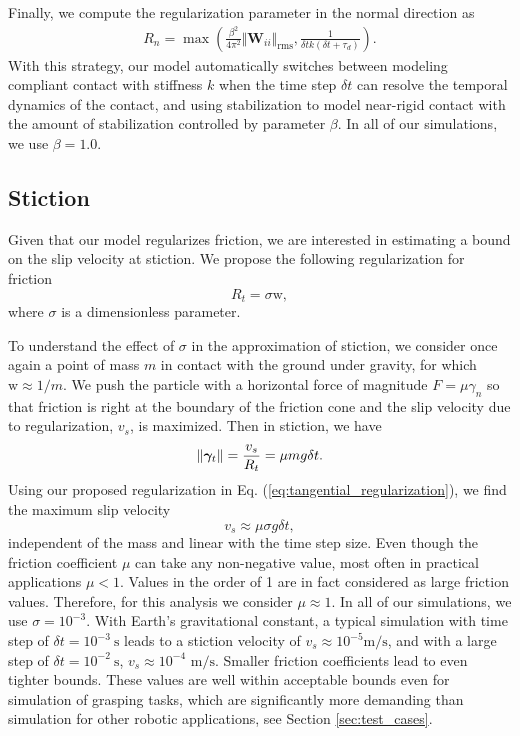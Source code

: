 Finally, we compute the regularization parameter in the normal direction as
\begin{eqnarray}
    R_n = \max\left(\frac{\beta^2}{4\pi^2}\Vert\mathbf{W}_{ii}\Vert_\text{rms},
    \frac{1}{\delta t k(\delta t+\tau_d)}\right)
    \label{eq:normal_regularization}.
\end{eqnarray}
With this strategy, our model automatically switches between modeling compliant
contact with stiffness $k$ when the time step $\delta t$ can resolve the
temporal dynamics of the contact, and using stabilization to model near-rigid
contact with the amount of stabilization controlled by parameter $\beta$. In all
of our simulations, we use $\beta=1.0$.

\subsection{Stiction}
\label{sec:stiction_parameterization}

Given that our model regularizes friction, we are interested in estimating a
bound on the slip velocity at stiction. We propose the following regularization
for friction
\begin{equation}
    R_t = \sigma \text{w},
    \label{eq:tangential_regularization}
\end{equation}
where $\sigma$ is a dimensionless parameter.

To understand the effect of $\sigma$ in the approximation of stiction, we
consider once again a point of mass $m$ in contact with the ground under
gravity, for which $\text{w}\approx 1/m$. We push the particle with a horizontal
force of magnitude $F=\mu\gamma_n$ so that friction is right at the boundary of
the friction cone and the slip velocity due to regularization, $v_s$, is
maximized. Then in stiction, we have
\begin{equation*}
    \|{\bm\gamma}_t\| = \frac{v_s}{R_t} = \mu m g \delta t.
\end{equation*}
Using our proposed regularization in Eq. (\ref{eq:tangential_regularization}),
we find the maximum slip velocity
\begin{equation}
    v_s \approx \mu\sigma g \delta t,
    \label{eq:slip_estimation}
\end{equation}
independent of the mass and linear with the time step size. Even though the
friction coefficient $\mu$ can take any non-negative value, most often in
practical applications $\mu < 1$. Values in the order of 1 are in fact
considered as large friction values. Therefore, for this analysis we consider
$\mu\approx 1$. In all of our simulations, we use $\sigma=10^{-3}$. With Earth's
gravitational constant, a typical simulation with time step of $\delta
t=10^{-3}~\text{s}$ leads to a stiction velocity of $v_s\approx
10^{-5}\text{m}/\text{s}$, and with a large step of $\delta t=10^{-2}~\text{s}$,
$v_s\approx 10^{-4}\text{ m}/\text{s}$. Smaller friction coefficients lead to
even tighter bounds. These values are well within acceptable bounds even for
simulation of grasping tasks, which are significantly more demanding than
simulation for other robotic applications, see Section \ref{sec:test_cases}.

